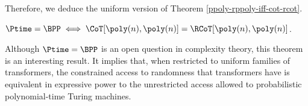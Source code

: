 \bigskip

Therefore, we deduce the uniform version of Theorem \ref{ppoly-rppoly-iff-cot-rcot}.
%
\begin{theorem}\label{p-bpp-iff-ucot-urcot}
    $\Ptime = \BPP \iff \CoT[\poly(n), \poly(n)] = \RCoT[\poly(n), \poly(n)]$.
\end{theorem}

Although $\Ptime = \BPP$ is an open question in complexity theory, this theorem is an interesting result.
It implies that, when restricted to uniform families of transformers, the constrained access to randomness that transformers have is equivalent in expressive power to the unrestricted access allowed to probabilistic polynomial-time Turing machines.